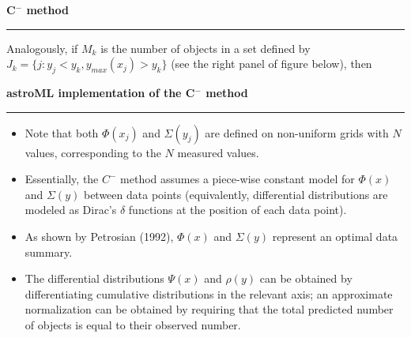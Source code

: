 \documentclass[letterpaper,landscape]{slides}
\begin{document}
\begin{slide}
\begin{center}
\bfseries
{\large {\color{red} C$^-$ method}}
\end{center}
\vskip 0.2in
\hrule


Analogously, if $M_k$ is the
number of objects in a set defined by $J_k = \{ j:y_j < y_k, y_{max}(x_j) > y_k\}$
(see the right panel of figure below), then

\vskip -0.7in
\phantom{x}


\vfill
\end{slide}
 


\begin{slide}
\begin{center}
\bfseries
{\large {\color{red} astroML implementation of the C$^-$ method}}
\end{center}
\vskip 0.2in
\hrule

\begin{itemize}
\item 
Note that both $\Phi(x_j)$ and $\Sigma(y_j)$ are defined on non-uniform grids with $N$ values,
corresponding to the $N$ measured values. 
\item 
Essentially, the $C^{-}$ method assumes a piece-wise
constant model for $\Phi(x)$ and $\Sigma(y)$ between data points (equivalently, differential distributions
are modeled as Dirac's $\delta$ functions at the position of each data point). 
\item 
As shown by Petrosian (1992), $\Phi(x)$ and $\Sigma(y)$ represent an optimal data summary. 
\item
The differential distributions $\Psi(x)$ and $\rho(y)$ can be obtained by differentiating cumulative 
distributions in the relevant axis; an approximate normalization can be obtained by requiring that 
the total predicted number of objects is equal to their observed number. 
\end{itemize}

\vskip -0.7in
\phantom{x}

\vfill
\end{slide}
 
\end{document}
